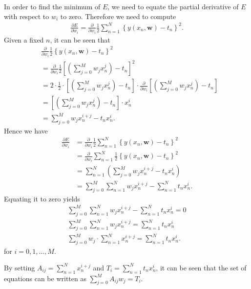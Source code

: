 \begin{answer}{}
	In order to find the minimum of $E$, we need to equate the partial derivative of $E$ with respect to $w_i$ to zero. Therefore we need to compute
	\begin{align}
		\frac{\partial E}{\partial w_i} = \frac{\partial}{\partial w_i} \frac{1}{2}\sum_{n=1}^{N} \left\{ y(x_n, \bm{w}) - t_n\right\}^2.
	\end{align}
	Given a fixed $n$, it can be seen that
	\begin{align}
		&\frac{\partial}{\partial w_i} \frac{1}{2} \left\{ y(x_n, \bm{w})- t_n \right\}^2\\
		&= \frac{\partial}{\partial w_i} \frac{1}{2} \left[ \left(\sum_{j = 0}^{M}w_j x_n^j\right) - t_n \right]^2\\
		&= 2 \cdot \frac{1}{2} \cdot \left[ \left(\sum_{j = 0}^{M}w_j x_n^j\right) - t_n \right] \cdot \frac{\partial}{\partial w_i} \left[ \left(\sum_{j = 0}^{M}w_j x_n^j\right) - t_n\right]\\
		&= \left[ \left(\sum_{j = 0}^{M}w_j x_n^j\right) - t_n \right] \cdot x_n^i\\
		&= \sum_{j = 0}^{M}w_j x_n^{i+j} - t_n x_n^i.
	\end{align}
	Hence we have
	\begin{align}
		\frac{\partial E}{\partial w_i} &= \frac{\partial}{\partial w_i} \frac{1}{2}\sum_{n=1}^{N} \left\{ y(x_n, \bm{w}) - t_n \right\}^2\\
		&= \frac{\partial}{\partial w_i} \sum_{n=1}^{N} \frac{1}{2}\left\{ y(x_n, \bm{w}) - t_n \right\}^2\\
		&= \sum_{n=1}^{N} \left( \sum_{j = 0}^{M}w_j x_n^{i+j} - t_n x_n^i \right)\\
		&= \sum_{j = 0}^{M} \sum_{n=1}^{N} w_j x_n^{i+j} - \sum_{n=1}^{N} t_n x_n^i.
	\end{align}
	Equating it to zero yields
	\begin{gather}
		\sum_{j = 0}^{M} \sum_{n=1}^{N} w_j x_n^{i+j} - \sum_{n=1}^{N} t_n x_n^i = 0\\
		\sum_{j = 0}^{M} \sum_{n=1}^{N} w_j x_n^{i+j} = \sum_{n=1}^{N} t_n x_n^i\\
		\sum_{j = 0}^{M} w_j \cdot \sum_{n=1}^{N} x_n^{i+j} = \sum_{n=1}^{N} t_n x_n^i.
	\end{gather}
	for $i = 0, 1, \ldots, M$.

	By setting $A_{ij} = \sum_{n=1}^{N} x_n^{i+j}$ and $T_i = \sum_{n=1}^{N} t_n x_n^i$, it can be seen that the set of equations can be written as $\sum_{j = 0}^{M} A_{ij}w_j = T_i$.
\end{answer}
